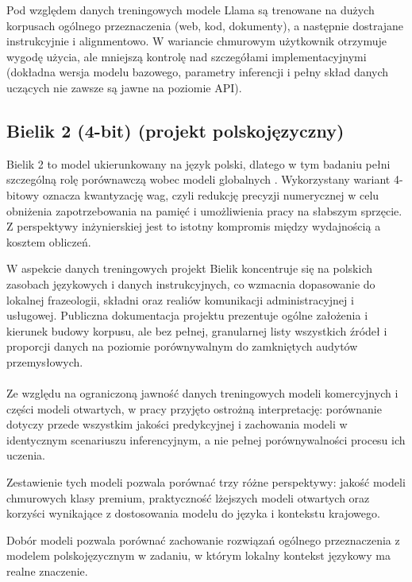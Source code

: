 \documentclass[12pt,a4paper,openright]{report}
\begin{document}
Pod względem danych treningowych modele Llama są trenowane na dużych korpusach ogólnego przeznaczenia (web, kod, dokumenty), a następnie dostrajane instrukcyjnie i alignmentowo. W wariancie chmurowym użytkownik otrzymuje wygodę użycia, ale mniejszą kontrolę nad szczegółami implementacyjnymi (dokładna wersja modelu bazowego, parametry inferencji i pełny skład danych uczących nie zawsze są jawne na poziomie API).

\subsection{Bielik 2 (4-bit) (projekt polskojęzyczny)}

Bielik 2 to model ukierunkowany na język polski, dlatego w tym badaniu pełni szczególną rolę porównawczą wobec modeli globalnych \cite{bielik2024,piotrowski2024evaluating}. Wykorzystany wariant 4-bitowy oznacza kwantyzację wag, czyli redukcję precyzji numerycznej w celu obniżenia zapotrzebowania na pamięć i umożliwienia pracy na słabszym sprzęcie. Z perspektywy inżynierskiej jest to istotny kompromis między wydajnością a kosztem obliczeń.

W aspekcie danych treningowych projekt Bielik koncentruje się na polskich zasobach językowych i danych instrukcyjnych, co wzmacnia dopasowanie do lokalnej frazeologii, składni oraz realiów komunikacji administracyjnej i usługowej. Publiczna dokumentacja projektu prezentuje ogólne założenia i kierunek budowy korpusu, ale bez pełnej, granularnej listy wszystkich źródeł i proporcji danych na poziomie porównywalnym do zamkniętych audytów przemysłowych.

\paragraph{}Ze względu na ograniczoną jawność danych treningowych modeli komercyjnych i części modeli otwartych, w pracy przyjęto ostrożną interpretację: porównanie dotyczy przede wszystkim jakości predykcyjnej i zachowania modeli w identycznym scenariuszu inferencyjnym, a nie pełnej porównywalności procesu ich uczenia.

Zestawienie tych modeli pozwala porównać trzy różne perspektywy: jakość modeli chmurowych klasy premium, praktyczność lżejszych modeli otwartych oraz korzyści wynikające z dostosowania modelu do języka i kontekstu krajowego.

Dobór modeli pozwala porównać zachowanie rozwiązań ogólnego przeznaczenia z modelem polskojęzycznym w zadaniu, w którym lokalny kontekst językowy ma realne znaczenie.
\end{document}
